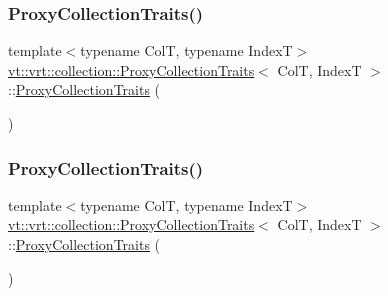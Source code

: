 \subsubsection{\texorpdfstring{Proxy\+Collection\+Traits()}{ProxyCollectionTraits()}\hspace{0.1cm}{\footnotesize\ttfamily [2/4]}}
{\footnotesize\ttfamily template$<$typename ColT, typename IndexT$>$ \\
\hyperlink{structvt_1_1vrt_1_1collection_1_1_proxy_collection_traits}{vt\+::vrt\+::collection\+::\+Proxy\+Collection\+Traits}$<$ ColT, IndexT $>$\+::\hyperlink{structvt_1_1vrt_1_1collection_1_1_proxy_collection_traits}{Proxy\+Collection\+Traits} (\begin{DoxyParamCaption}\item[{\hyperlink{structvt_1_1vrt_1_1collection_1_1_proxy_collection_traits}{Proxy\+Collection\+Traits}$<$ ColT, IndexT $>$ const \&}]{ }\end{DoxyParamCaption})\hspace{0.3cm}{\ttfamily [default]}}

\mbox{\label{structvt_1_1vrt_1_1collection_1_1_proxy_collection_traits_af8c270e30f87c1247a811b6116c3622c}} 
\subsubsection{\texorpdfstring{Proxy\+Collection\+Traits()}{ProxyCollectionTraits()}\hspace{0.1cm}{\footnotesize\ttfamily [3/4]}}
{\footnotesize\ttfamily template$<$typename ColT, typename IndexT$>$ \\
\hyperlink{structvt_1_1vrt_1_1collection_1_1_proxy_collection_traits}{vt\+::vrt\+::collection\+::\+Proxy\+Collection\+Traits}$<$ ColT, IndexT $>$\+::\hyperlink{structvt_1_1vrt_1_1collection_1_1_proxy_collection_traits}{Proxy\+Collection\+Traits} (\begin{DoxyParamCaption}\item[{\hyperlink{structvt_1_1vrt_1_1collection_1_1_proxy_collection_traits}{Proxy\+Collection\+Traits}$<$ ColT, IndexT $>$ \&\&}]{ }\end{DoxyParamCaption})\hspace{0.3cm}{\ttfamily [default]}}

